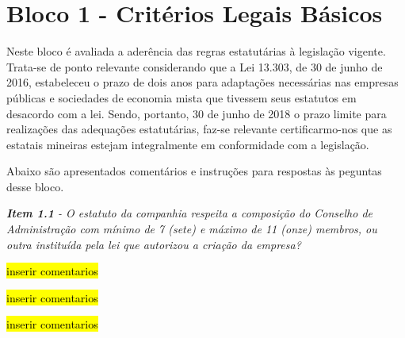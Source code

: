 
\section{Bloco 1 - Critérios Legais Básicos}
Neste bloco é avaliada a aderência das regras estatutárias à legislação vigente. Trata-se de ponto relevante considerando que a Lei 13.303, de 30 de junho de 2016, estabeleceu o prazo de dois anos para adaptações necessárias nas empresas públicas e sociedades de economia mista que tivessem seus estatutos em desacordo com a lei.
Sendo, portanto, 30 de junho de 2018 o prazo limite para realizações das adequações estatutárias, faz-se relevante certificarmo-nos que as estatais mineiras estejam integralmente em conformidade com a legislação.

Abaixo são apresentados comentários e instruções para respostas às peguntas desse bloco.

\vspace

\begin{framed}
\noindent\textit{\textbf{Item 1.1} - O estatuto da companhia respeita a composição do Conselho de Administração com mínimo de 7 (sete) e máximo de 11 (onze) membros, ou outra instituída pela lei que autorizou a criação da empresa?}
\end{framed}

\hl{inserir comentarios}

\begin{framed}
\end{framed}

\hl{inserir comentarios}

\begin{framed}
\end{framed}

\hl{inserir comentarios}

\begin{framed}
\end{framed}

